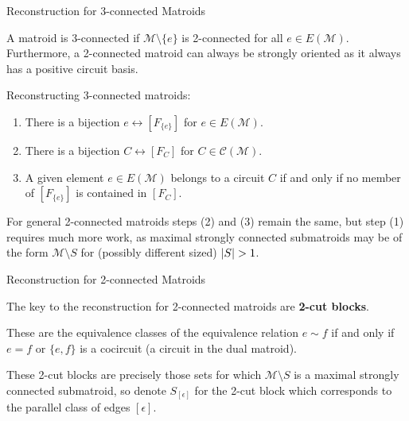 \documentclass[9pt]{beamer}
\def\calM{\mathcal M}
\def\calC{\mathcal C}
\DeclarePairedDelimiter\abs{\lvert}{\rvert}
\begin{document}
    \begin{frame}{Reconstruction for 3-connected Matroids}

        A matroid is 3-connected if $\calM\setminus\{e\}$ is 2-connected for all $e\in E(\calM)$.
        Furthermore, a 2-connected matroid can always be strongly oriented as it always has a positive circuit basis.

        \vspace{12pt}

        Reconstructing 3-connected matroids:

        \pause

        \begin{enumerate}
            \item There is a bijection $e\leftrightarrow [F_{\{e\}}]$ for $e\in E(\calM)$.\pause
            \item There is a bijection $C\leftrightarrow [F_C]$ for $C\in\calC(\calM)$.\pause
            \item A given element $e\in E(\calM)$ belongs to a circuit $C$ if and only if no member of $[F_{\{e\}}]$ is contained in $[F_C]$.\pause
        \end{enumerate}

        \vspace{12pt}

        For general 2-connected matroids steps (2) and (3) remain the same, but step (1) requires much more work, as maximal strongly connected submatroids may be of the form $\calM\setminus S$ for (possibly different sized) $\abs*{S}>1$.
        
    \end{frame}

    \begin{frame}{Reconstruction for 2-connected Matroids}

        The key to the reconstruction for 2-connected matroids are \textbf{2-cut blocks}.

        \vspace{12pt}
        
        These are the equivalence classes of the equivalence relation $e\sim f$ if and only if $e=f$ or $\{e, f\}$ is a cocircuit (a circuit in the dual matroid).

        \vspace{12pt}
        
        These 2-cut blocks are precisely those sets for which $\calM\setminus S$ is a maximal strongly connected submatroid, so denote $S_{[\epsilon]}$ for the 2-cut block which corresponds to the parallel class of edges $[\epsilon]$.

    \end{frame}
\end{document}
